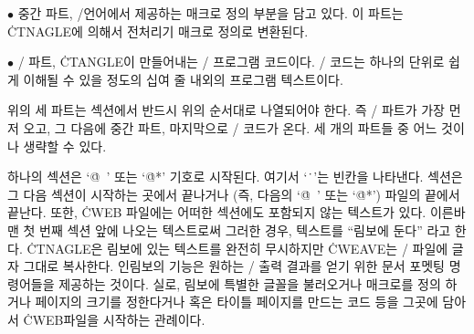 \item{$\bullet$} 중간 파트, \CEE/언어에서 제공하는 매크로 정의 부분을 담고
있다. 이 파트는 \.{CTNAGLE}에 의해서 전처리기 매크로 정의로 변환된다.

\item{$\bullet$} \CEE/ 파트, \.{CTANGLE}이 만들어내는 \CEE/ 프로그램 코드이다.
\CEE/ 코드는 하나의 단위로 쉽게 이해될 수 있을 정도의 십여 줄 내외의 프로그램 텍스트이다. 

\yskip\noindent 위의 세 파트는 섹션에서 반드시 위의 순서대로 나열되어야 한다. 
즉 \TEX/ 파트가 가장 먼저 오고, 그 다음에 중간 파트, 마지막으로 \CEE/ 코드가 온다.
세 개의 파트들 중 어느 것이나 생략할 수 있다.

하나의 섹션은 `\.{@\ }' 또는 `\.{@*}' 기호로 시작된다. 여기서 `\.{\ }'는 빈칸을
나타낸다. 섹션은 그 다음 섹션이 시작하는 곳에서 끝나거나
(즉, 다음의 `\.{@\ }' 또는 `\.{@*}') 파일의 끝에서 끝난다. 또한, \.{CWEB} 
파일에는 어떠한 섹션에도 포함되지 않는 텍스트가 있다. 이른바 맨 첫 번째
섹션 앞에 나오는 텍스트로써 그러한 경우, 텍스트를 ``림보에 둔다'' 라고 한다.
\.{CTNAGLE}은 림보에 있는 텍스트를 완전히 무시하지만 \.{CWEAVE}는 \TEX/ 파일에
글자 그대로 복사한다. 인림보의 기능은 원하는 \TEX/ 출력 결과를 얻기 위한 문서
포멧팅 명령어들을 제공하는 것이다. 실로, 림보에 특별한 글꼴을 불러오거나 매크로를 정의 
하거나 페이지의 크기를 정한다거나 혹은 타이틀 페이지를 만드는 코드 등을
그곳에 담아서 \.{CWEB}파일을 시작하는 관례이다.

